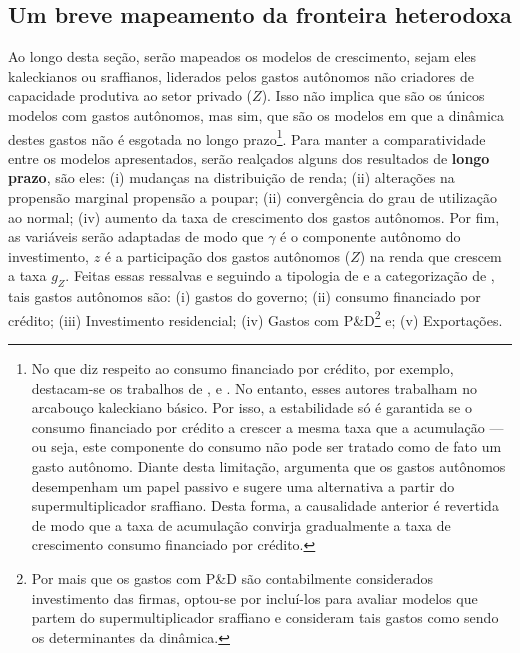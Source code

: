\subsection{Um breve mapeamento da fronteira heterodoxa}
\label{Hibridos}


Ao longo desta seção, serão mapeados os modelos de crescimento, 
sejam eles kaleckianos ou sraffianos, liderados pelos gastos autônomos não criadores de capacidade produtiva ao setor privado ($Z$). Isso não implica que são os únicos modelos com gastos autônomos, mas sim, que são os modelos em que a dinâmica destes gastos não é esgotada no longo prazo\footnote{
	No que diz respeito ao consumo financiado por crédito, por exemplo, destacam-se os trabalhos de \textcite{dutt_maturity_2006}, \textcite{palley_inside_2010} e \textcite{hein_finance-dominated_2012}.
	No entanto, esses autores trabalham no arcabouço kaleckiano básico. Por isso, a estabilidade só é garantida se o consumo financiado por crédito a crescer a mesma taxa que a acumulação --- ou seja, este componente do consumo não pode ser tratado como de fato um gasto autônomo.
	Diante desta limitação, \textcite{pariboni_household_2016} argumenta que os gastos autônomos desempenham um papel passivo e sugere uma alternativa a partir do supermultiplicador sraffiano. Desta forma, a causalidade anterior é revertida de modo que a taxa de acumulação convirja gradualmente a taxa de crescimento consumo financiado por crédito.
}.
Para manter a comparatividade entre os modelos apresentados, serão realçados alguns dos resultados de \textbf{longo prazo}, são eles: (i) mudanças na distribuição de renda; (ii) alterações na propensão marginal propensão a poupar; (ii) convergência do grau de utilização ao normal; (iv) aumento da taxa de crescimento dos gastos autônomos. Por fim, as variáveis serão adaptadas de modo que $\gamma$ é o componente autônomo do investimento,  $z$ é a participação dos gastos autônomos ($Z$) na renda que crescem a taxa $g_Z$.
Feitas essas ressalvas e seguindo a tipologia de \textcite{cesaratto_technical_2003} e a categorização de \textcite{serrano_sraffian_1995}, tais gastos autônomos são: (i) gastos do governo; (ii) consumo financiado por crédito; (iii) Investimento residencial; (iv) Gastos com P\&D\footnote{
	Por mais que os gastos com P\&D são contabilmente considerados investimento das firmas, optou-se por incluí-los para avaliar modelos que partem do supermultiplicador sraffiano e consideram tais gastos como sendo os determinantes da dinâmica.
} e; (v) Exportações.


